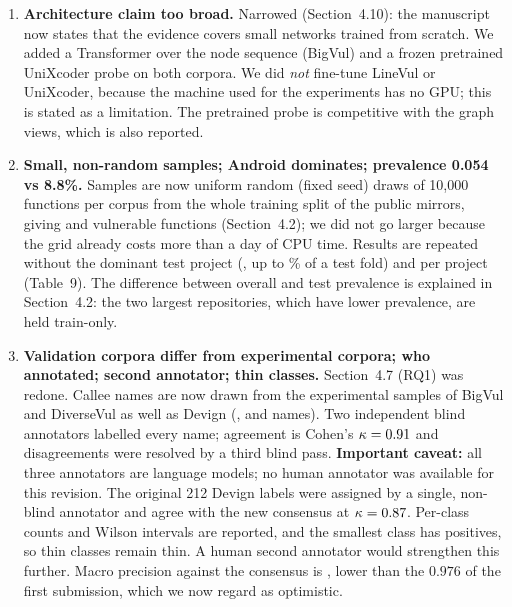 \documentclass[11pt]{article}
\newcommand{\sect}[1]{Section~#1}
\begin{document}
\begin{enumerate}[leftmargin=*, label=\textbf{\arabic*.}]
\item \textbf{Architecture claim too broad.}
Narrowed (\sect{4.10}): the manuscript now states that the evidence covers small
networks trained from scratch. We added a Transformer over the node sequence
(BigVul) and a frozen pretrained UniXcoder probe on both corpora. We did
\emph{not} fine-tune LineVul or UniXcoder, because the machine used for the
experiments has no GPU; this is stated as a limitation. The pretrained probe is
competitive with the graph views, which is also reported.

\item \textbf{Small, non-random samples; Android dominates; prevalence 0.054 vs
8.8\%.}
Samples are now uniform random (fixed seed) draws of 10{,}000 functions per
corpus from the whole training split of the public mirrors, giving
\numbigvulVuln{} and \numdiversevulVuln{} vulnerable functions
(\sect{4.2}); we did not go larger because the grid already costs more than a
day of CPU time. Results are repeated without the dominant test project
(\texttt{\numbigvulTopTestProject}, up to \numbigvulTopTestShareMax\% of a test
fold) and per project (Table~9). The difference between
overall and test prevalence is explained in \sect{4.2}: the two largest
repositories, which have lower prevalence, are held train-only.

\item \textbf{Validation corpora differ from experimental corpora; who
annotated; second annotator; thin classes.}
\sect{4.7} (RQ1) was redone. Callee names are now drawn from the experimental
samples of BigVul and DiverseVul as well as Devign
(\numdevignNNames{}, \numbigvulNNames{} and \numdiversevulNNames{} names). Two
independent blind annotators labelled every name; agreement is Cohen's
$\kappa=0.91{}$ and disagreements were resolved by a third blind
pass. \textbf{Important caveat:} all three annotators are language models; no
human annotator was available for this revision. The original 212 Devign labels
were assigned by a single, non-blind annotator and agree with the new consensus
at $\kappa=0.87{}$. Per-class counts and Wilson intervals are
reported, and the smallest class has \numminClassPositives{} positives, so thin
classes remain thin. A human second annotator would strengthen this further.
Macro precision against the consensus is \numpooledMacroP{}, lower than the
$0.976$ of the first submission, which we now regard as optimistic.


\end{enumerate}
\end{document}
